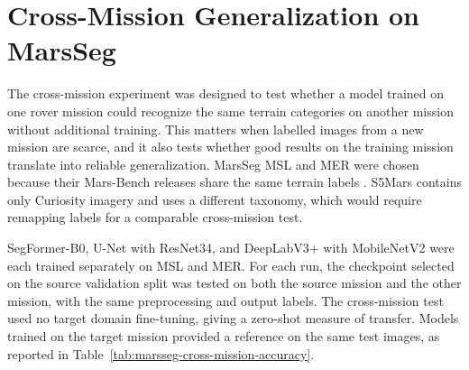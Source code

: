 
\section{Cross-Mission Generalization on MarsSeg}
\label{sec:marsseg-cross-mission-generalization}

The cross-mission experiment was designed to test whether a model trained on one rover mission could recognize the same terrain categories on another mission without additional training. This matters when labelled images from a new mission are scarce, and it also tests whether good results on the training mission translate into reliable generalization. MarsSeg MSL and MER were chosen because their Mars-Bench releases share the same terrain labels \cite{purohit2025marsbench}. S5Mars contains only Curiosity imagery and uses a different taxonomy, which would require remapping labels for a comparable cross-mission test.

SegFormer-B0, U-Net with ResNet34, and DeepLabV3+ with MobileNetV2 were each trained separately on MSL and MER. For each run, the checkpoint selected on the source validation split was tested on both the source mission and the other mission, with the same preprocessing and output labels. The cross-mission test used no target domain fine-tuning, giving a zero-shot measure of transfer. Models trained on the target mission provided a reference on the same test images, as reported in Table~\ref{tab:marsseg-cross-mission-accuracy}.

